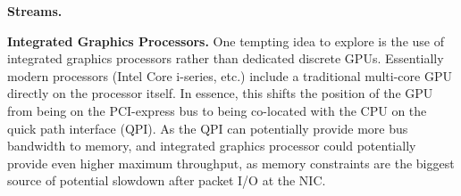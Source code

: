 \medskip \noindent \textbf{Streams.} 

\medskip \noindent \textbf{Integrated Graphics Processors.} One tempting idea to
explore is the use of integrated graphics processors rather than dedicated
discrete GPUs. Essentially modern processors (Intel Core i-series, etc.) include
a traditional multi-core GPU directly on the processor itself. In essence, this
shifts the position of the GPU from being on the PCI-express bus to being
co-located with the CPU on the quick path interface (QPI). As the QPI can
potentially provide more bus bandwidth to memory, and integrated graphics processor could
potentially provide even higher maximum throughput, as memory constraints are
the biggest source of potential slowdown after packet I/O at the NIC.
